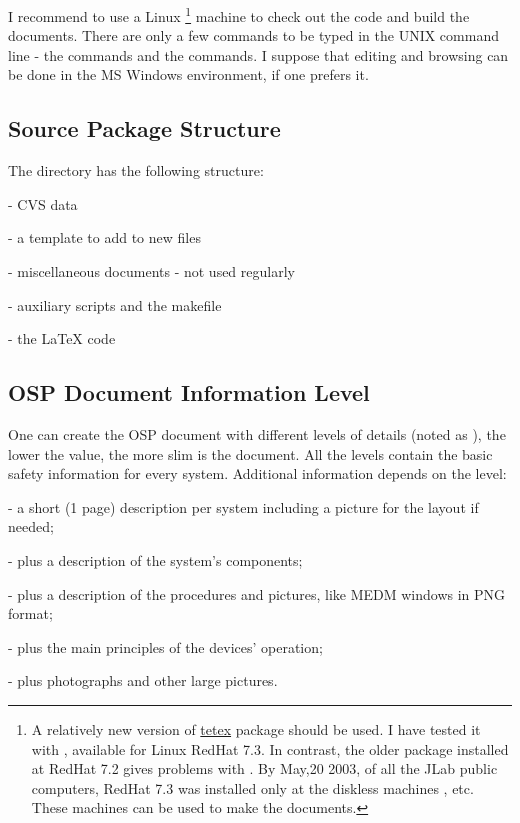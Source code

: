 \documentclass[12pt,letterpaper]{article}
\newcommand{\myil}[0]{{\color{red}{\em infolevel}}}
\begin{document}
  I recommend to use a Linux%
\footnote{A relatively new version of \href{http://www.tug.org/teTeX/}{tetex} 
  package should be used. I have tested it with ,
  available for Linux RedHat 7.3. In contrast, the older package
  installed at RedHat 7.2 gives problems with .
  By May,20 2003, of all the JLab public computers, RedHat 7.3 was installed only
  at the diskless machines ,  etc. These machines
  can be used to make the documents.
}
  machine to
  check out the code and build the documents.
  There are only a few commands to be typed in the UNIX
  command line - the  commands and the
   commands. I suppose that editing and
  browsing can be done in the MS Windows environment,
  if one prefers it. 

\subsection{Source Package Structure}
\label{sec:structure}

  The  directory has the following structure:

  \begin{list}{}{\setlength{\itemsep}{-0.15cm}}
    \item {} - CVS data
    \item {} - a template to add to new files
    \item {} - miscellaneous documents - not used regularly
    \item {} - auxiliary scripts and the makefile
    \item {} - the \LaTeX{} code
  \end{list}

\subsection{OSP Document Information Level}
\label{sec:infolev}

  One can create the OSP document with different levels of
  details (noted as \myil{}), the lower the value, 
  the more slim is the document. All the levels contain the 
  basic safety information for every system. Additional 
  information depends on the level:
  \begin{list}{}{\setlength{\itemsep}{-0.15cm}}
    \item[{\color{red}0}] - a short (1 page) description per system including 
            a picture for the layout if needed;
    \item[{\color{red}1}] - plus a description of the system's components;
    \item[{\color{red}2}] - plus a description of the procedures and pictures, 
               like MEDM windows in PNG format;
    \item[{\color{red}3}] - plus the main principles of the devices' 
               operation;
    \item[{\color{red}4}] - plus photographs and other large pictures.
  \end{list} 
\end{document}
